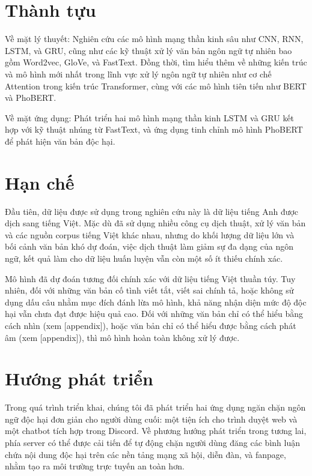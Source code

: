 \section*{Thành tựu}
Về mặt lý thuyết: Nghiên cứu các mô hình mạng thần kinh sâu như CNN, RNN, LSTM, và GRU, cũng như các kỹ thuật xử lý văn bản ngôn ngữ tự nhiên bao gồm Word2vec, GloVe, và FastText. Đồng thời, tìm hiểu thêm về những kiến trúc và mô hình mới nhất trong lĩnh vực xử lý ngôn ngữ tự nhiên như cơ chế Attention trong kiến trúc Transformer, cùng với các mô hình tiên tiến như BERT và PhoBERT.

Về mặt ứng dụng: Phát triển hai mô hình mạng thần kinh LSTM và GRU kết hợp với kỹ thuật nhúng từ FastText, và ứng dụng tinh chỉnh mô hình PhoBERT để phát hiện văn bản độc hại.

\section*{Hạn chế}
Đầu tiên, dữ liệu được sử dụng trong nghiên cứu này là dữ liệu tiếng Anh được dịch sang tiếng Việt. Mặc dù đã sử dụng nhiều công cụ dịch thuật, xử lý văn bản và các nguồn corpus tiếng Việt khác nhau, nhưng do khối lượng dữ liệu lớn và bối cảnh văn bản khó dự đoán, việc dịch thuật làm giảm sự đa dạng của ngôn ngữ, kết quả làm cho dữ liệu huấn luyện vẫn còn một số ít thiếu chính xác.

Mô hình đã dự đoán tương đối chính xác với dữ liệu tiếng Việt thuần túy. Tuy nhiên, đối với những văn bản cố tình viết tắt, viết sai chính tả, hoặc không sử dụng dấu câu nhằm mục đích đánh lừa mô hình, khả năng nhận diện mức độ độc hại vẫn chưa đạt được hiệu quả cao. Đối với những văn bản chỉ có thể hiểu bằng cách nhìn (xem [appendix]), hoặc văn bản chỉ có thể hiểu được bằng cách phát âm (xem [appendix]), thì mô hình hoàn toàn không xử lý được.

\section*{Hướng phát triển}
Trong quá trình triển khai, chúng tôi đã phát triển hai ứng dụng ngăn chặn ngôn ngữ độc hại đơn giản cho người dùng cuối: một tiện ích cho trình duyệt web và một chatbot tích hợp trong Discord. Về phương hướng phát triển trong tương lai, phía server có thể được cải tiến để tự động chặn người dùng đăng các bình luận chứa nội dung độc hại trên các nền tảng mạng xã hội, diễn đàn, và fanpage, nhằm tạo ra môi trường trực tuyến an toàn hơn.